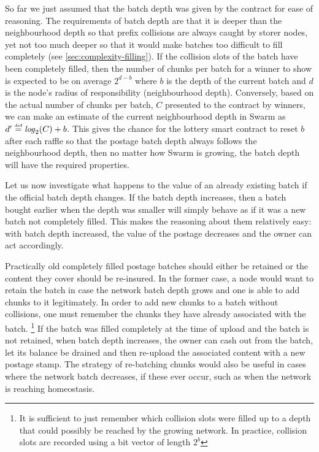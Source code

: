 So far we just assumed that the batch depth was given by the contract for ease of reasoning. The requirements of batch depth are that it is deeper than the neighbourhood depth so that prefix collisions are always caught by storer nodes, yet not too much deeper so that it would make batches too difficult to fill completely (see \ref{sec:complexity-filling}). If the collision slots of the batch have been completely filled, then the number of chunks per batch for a winner to show is expected to be on average $2^{d-b}$ where $b$ is the depth of the current batch and $d$ is the node's radius of responsibility (neighbourhood depth). Conversely, based on the actual number of chunks per batch, $C$ presented to the contract by winners, we can make an estimate of the current neighbourhood depth in Swarm as $d'\overset{\textrm{\tiny def}}{=}\mathit{log}_2(C)+b$. This gives the chance for the lottery smart contract to reset $b$ after each raffle so that the postage batch depth always follows the neighbourhood depth, then no matter how Swarm is growing, the batch depth will have the required properties. 

Let us now investigate what happens to the value of an already existing batch if the official batch depth changes. If the batch depth increases, then a batch bought earlier when the depth was smaller will simply behave as if it was a new batch not completely filled. This makes the reasoning about them relatively easy: with batch depth increased, the value of the postage decreases and the owner can act accordingly.

Practically old completely filled postage batches should either be retained or the content they cover should be re-insured. In the former case, a node would want to retain the batch in case the network batch depth grows and one is able to add chunks to it legitimately. 
In order to add new chunks to a batch without collisions, one must remember the chunks they have already associated with the batch.%
%
\footnote{It is sufficient to just remember which collision slots were filled up to a depth that could possibly be reached by the growing network. In practice, collision slots are recorded using a bit vector of length  $2^b$}
%
If the batch was filled completely at the time of upload and the batch is not retained, when batch depth increases, the owner can cash out from the batch, let its balance be drained and then re-upload the associated content with a new postage stamp. The strategy of re-batching chunks would also be useful in cases where the network batch decreases, if these ever occur, such as when the network is reaching homeostasis.

